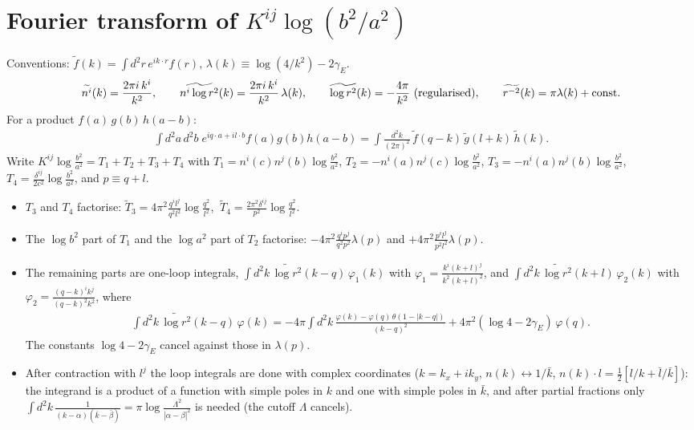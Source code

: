 \documentclass[10pt]{article}
\numberwithin{equation}{section}
\begin{document}
\appendix

\section{Fourier transform of $K^{ij}\log(b^{2}/a^{2})$}\label{app:FT}

Conventions: $\tilde f(k)=\int d^{2}r\,e^{ik\cdot r}f(r)$, $\lambda(k)\equiv\log(4/k^{2})-2\gamma_{E}$.
\begin{align}
\widetilde{n^{i}}(k)=\frac{2\pi i\,k^{i}}{k^{2}},\qquad
\widetilde{n^{i}\log r^{2}}(k)=\frac{2\pi i\,k^{i}}{k^{2}}\,\lambda(k),\qquad
\widetilde{\log r^{2}}(k)=-\frac{4\pi}{k^{2}}\ \text{(regularised)},\qquad
\widetilde{r^{-2}}(k)=\pi\lambda(k)+{\rm const}.
\end{align}
For a product $f(a)\,g(b)\,h(a-b)$:
\begin{align}
\int d^{2}a\,d^{2}b\;e^{iq\cdot a+il\cdot b}f(a)g(b)h(a-b)=\int\frac{d^{2}k}{(2\pi)^{2}}\,\tilde f(q-k)\,\tilde g(l+k)\,\tilde h(k).
\end{align}
Write $K^{ij}\log\frac{b^{2}}{a^{2}}=T_{1}+T_{2}+T_{3}+T_{4}$ with
$T_{1}=n^{i}(c)n^{j}(b)\log\frac{b^{2}}{a^{2}}$, $T_{2}=-n^{i}(a)n^{j}(c)\log\frac{b^{2}}{a^{2}}$, $T_{3}=-n^{i}(a)n^{j}(b)\log\frac{b^{2}}{a^{2}}$, $T_{4}=\frac{\delta^{ij}}{2c^{2}}\log\frac{b^{2}}{a^{2}}$, and $p\equiv q+l$.
\begin{itemize}
\item $T_{3}$ and $T_{4}$ factorise: $\tilde T_{3}=4\pi^{2}\frac{q^{i}l^{j}}{q^{2}l^{2}}\log\frac{q^{2}}{l^{2}}$, $\ \tilde T_{4}=\frac{2\pi^{2}\delta^{ij}}{p^{2}}\log\frac{q^{2}}{l^{2}}$.
\item The $\log b^{2}$ part of $T_{1}$ and the $\log a^{2}$ part of $T_{2}$ factorise: $-4\pi^{2}\frac{q^{i}p^{j}}{q^{2}p^{2}}\lambda(p)$ and $+4\pi^{2}\frac{p^{i}l^{j}}{p^{2}l^{2}}\lambda(p)$.
\item The remaining parts are one-loop integrals,
$\int d^{2}k\,\widetilde{\log r^{2}}(k-q)\,\varphi_{1}(k)$ with $\varphi_{1}=\frac{k^{i}(k+l)^{j}}{k^{2}(k+l)^{2}}$, and
$\int d^{2}k\,\widetilde{\log r^{2}}(k+l)\,\varphi_{2}(k)$ with $\varphi_{2}=\frac{(q-k)^{i}k^{j}}{(q-k)^{2}k^{2}}$, where
\begin{align}
\int d^{2}k\,\widetilde{\log r^{2}}(k-q)\,\varphi(k)=-4\pi\int d^{2}k\,\frac{\varphi(k)-\varphi(q)\,\theta(1-|k-q|)}{(k-q)^{2}}+4\pi^{2}(\log4-2\gamma_{E})\,\varphi(q).
\end{align}
The constants $\log4-2\gamma_{E}$ cancel against those in $\lambda(p)$.
\item After contraction with $l^{j}$ the loop integrals are done with complex coordinates ($k=k_{x}+ik_{y}$, $n(k)\leftrightarrow1/\bar k$, $n(k)\cdot l=\tfrac12[l/k+\bar l/\bar k]$): the integrand is a product of a function with simple poles in $k$ and one with simple poles in $\bar k$, and after partial fractions only
$\int d^{2}k\,\frac{1}{(k-\alpha)(\bar k-\bar\beta)}=\pi\log\frac{\Lambda^{2}}{|\alpha-\beta|^{2}}$ is needed (the cutoff $\Lambda$ cancels).
\end{itemize}
\end{document}
